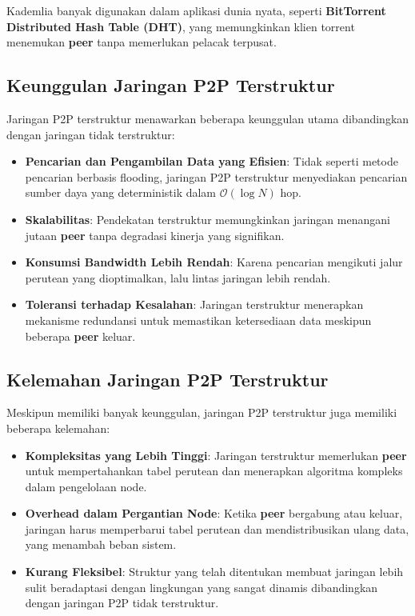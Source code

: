Kademlia banyak digunakan dalam aplikasi dunia nyata, seperti \textbf{BitTorrent Distributed Hash Table (DHT)}, yang memungkinkan klien torrent menemukan \textbf{peer} tanpa memerlukan pelacak terpusat.

\subsection{Keunggulan Jaringan P2P Terstruktur}
Jaringan P2P terstruktur menawarkan beberapa keunggulan utama dibandingkan dengan jaringan tidak terstruktur:
\begin{itemize}
	\item \textbf{Pencarian dan Pengambilan Data yang Efisien}: Tidak seperti metode pencarian berbasis flooding, jaringan P2P terstruktur menyediakan pencarian sumber daya yang deterministik dalam \textbf{\(\mathcal{O}(\log N)\)} hop.
	\item \textbf{Skalabilitas}: Pendekatan terstruktur memungkinkan jaringan menangani jutaan \textbf{peer} tanpa degradasi kinerja yang signifikan.
	\item \textbf{Konsumsi Bandwidth Lebih Rendah}: Karena pencarian mengikuti jalur perutean yang dioptimalkan, lalu lintas jaringan lebih rendah.
	\item \textbf{Toleransi terhadap Kesalahan}: Jaringan terstruktur menerapkan mekanisme redundansi untuk memastikan ketersediaan data meskipun beberapa \textbf{peer} keluar.
\end{itemize}

\subsection{Kelemahan Jaringan P2P Terstruktur}
Meskipun memiliki banyak keunggulan, jaringan P2P terstruktur juga memiliki beberapa kelemahan:
\begin{itemize}
	\item \textbf{Kompleksitas yang Lebih Tinggi}: Jaringan terstruktur memerlukan \textbf{peer} untuk mempertahankan tabel perutean dan menerapkan algoritma kompleks dalam pengelolaan node.
	\item \textbf{Overhead dalam Pergantian Node}: Ketika \textbf{peer} bergabung atau keluar, jaringan harus memperbarui tabel perutean dan mendistribusikan ulang data, yang menambah beban sistem.
	\item \textbf{Kurang Fleksibel}: Struktur yang telah ditentukan membuat jaringan lebih sulit beradaptasi dengan lingkungan yang sangat dinamis dibandingkan dengan jaringan P2P tidak terstruktur.
\end{itemize}

